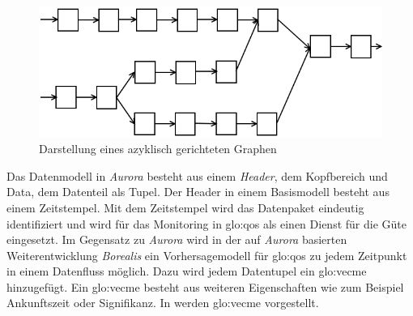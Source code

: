 \begin{figure}[htb!]
\centering
\includegraphics[width=1.0\textwidth]{bilder/DAG.png}
\caption{Darstellung eines azyklisch gerichteten Graphen
\label{fig:dag}}
\end{figure}

Das Datenmodell in \textit{Aurora} besteht aus einem \textit{Header}, dem Kopfbereich und Data, dem Datenteil als Tupel. Der Header in einem Basismodell besteht aus einem Zeitstempel. Mit dem Zeitstempel wird das Datenpaket eindeutig identifiziert und wird für das Monitoring in \gls{glo:qos} als einen Dienst für die Güte eingesetzt. Im Gegensatz zu \textit{Aurora} wird in der auf \textit{Aurora} basierten Weiterentwicklung \textit{Borealis} ein Vorhersagemodell für \gls{glo:qos} zu jedem Zeitpunkt in einem Datenfluss möglich. Dazu wird jedem Datentupel ein \gls{glo:vecme} hinzugefügt. Ein \gls{glo:vecme} besteht aus weiteren Eigenschaften wie zum Beispiel Ankunftszeit oder Signifikanz. In  werden \acrlong{glo:vecme} vorgestellt.

